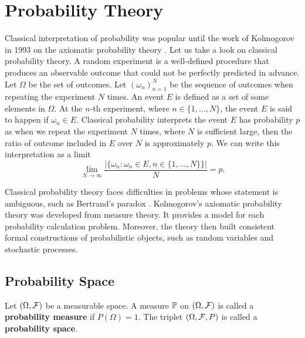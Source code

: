 \section{Probability Theory}

Classical interpretation of probability was popular until the work of Kolmogorov in 1993 on the axiomatic probability theory \cite{kolmogorov2018foundations}. Let us take a look on classical probability theory. A random experiment is a well-defined procedure that produces an observable outcome that could not be perfectly predicted in advance. Let $\Omega$ be the set of outcomes. Let $(\omega_n)_{n=1}^N$ be the sequence of outcomes when repeating the experiment $N$ times. An event $E$ is defined as a set of some elements in $\Omega$. At the $n$-th experiment, where $n\in\{1,\ldots,N\}$, the event $E$ is said to happen if $\omega_n\in E$. Classical probability interprets the event $E$ has probability $p$ as when we repeat the experiment $N$ times, where $N$ is sufficient large, then the ratio of outcome included in $E$ over $N$ is approximately $p$. We can write this interpretation as a limit
$$\lim\limits_{N\to\infty}\dfrac{|\{\omega_n : \omega_n\in E, n\in\{1,\ldots,N\}\}|}{N} = p.$$

Classical probability theory faces difficulties in problems whose statement is ambiguous, such as Bertrand's paradox \cite{shackel2007bertrand}. Kolmogorov's axiomatic probability theory was developed from measure theory. It provides a model for each probability calculation problem. Moreover, the theory then built consistent formal constructions of probabilistic objects, such as random variables and stochastic processes.

\subsection{Probability Space}

\begin{definition}
  Let $(\Omega, \mathcal{F})$ be a measurable space. A measure $\mathbb{P}$ on $(\Omega, \mathcal{F})$ is called a \textbf{probability measure} if $P(\Omega)=1$. The triplet $(\Omega, \mathcal{F}, P)$ is called a \textbf{probability space}.
\end{definition}

